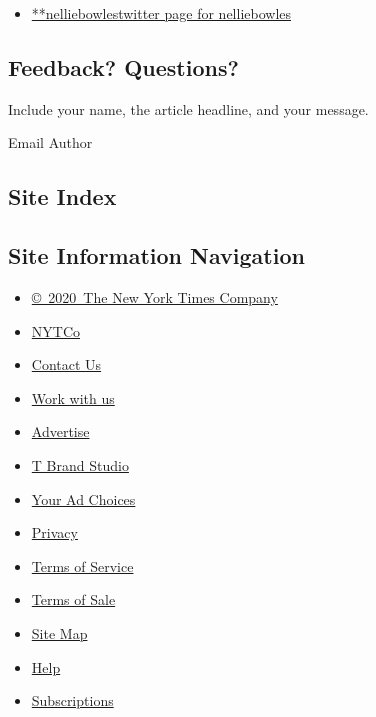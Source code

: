 \begin{itemize}
\tightlist
\item
  \href{https://twitter.com/nelliebowles}{**nelliebowlestwitter page for
  nelliebowles}
\end{itemize}

\hypertarget{feedback-questions}{%
\subsection{Feedback? Questions?}\label{feedback-questions}}

Include your name, the article headline, and your message.

Email Author

\hypertarget{site-index}{%
\subsection{Site Index}\label{site-index}}

\hypertarget{site-information-navigation}{%
\subsection{Site Information
Navigation}\label{site-information-navigation}}

\begin{itemize}
\tightlist
\item
  \href{https://help.nytimes3xbfgragh.onion/hc/en-us/articles/115014792127-Copyright-notice}{©~2020~The
  New York Times Company}
\end{itemize}

\begin{itemize}
\tightlist
\item
  \href{https://www.nytco.com/}{NYTCo}
\item
  \href{https://help.nytimes3xbfgragh.onion/hc/en-us/articles/115015385887-Contact-Us}{Contact
  Us}
\item
  \href{https://www.nytco.com/careers/}{Work with us}
\item
  \href{https://nytmediakit.com/}{Advertise}
\item
  \href{http://www.tbrandstudio.com/}{T Brand Studio}
\item
  \href{https://www.nytimes3xbfgragh.onion/privacy/cookie-policy\#how-do-i-manage-trackers}{Your
  Ad Choices}
\item
  \href{https://www.nytimes3xbfgragh.onion/privacy}{Privacy}
\item
  \href{https://help.nytimes3xbfgragh.onion/hc/en-us/articles/115014893428-Terms-of-service}{Terms
  of Service}
\item
  \href{https://help.nytimes3xbfgragh.onion/hc/en-us/articles/115014893968-Terms-of-sale}{Terms
  of Sale}
\item
  \href{https://spiderbites.nytimes3xbfgragh.onion}{Site Map}
\item
  \href{https://help.nytimes3xbfgragh.onion/hc/en-us}{Help}
\item
  \href{https://www.nytimes3xbfgragh.onion/subscription?campaignId=37WXW}{Subscriptions}
\end{itemize}
